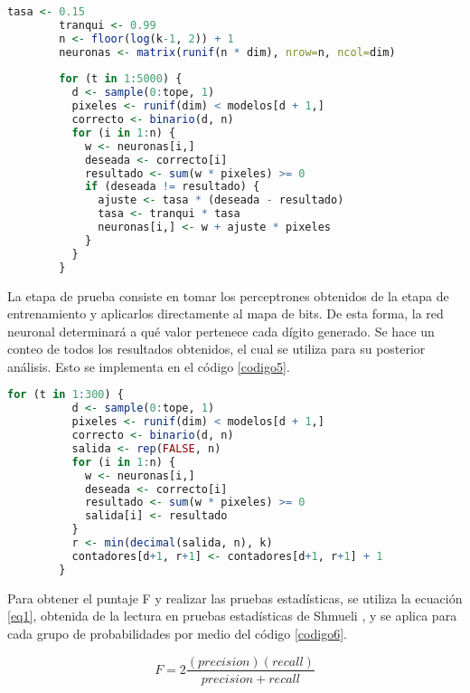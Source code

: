 \documentclass{report}
\begin{document}
\begin{lstlisting}[caption=Etapa de Entrenamiento de los Perceptrones, label=codigo4, language=R]
        tasa <- 0.15
        tranqui <- 0.99
        n <- floor(log(k-1, 2)) + 1
        neuronas <- matrix(runif(n * dim), nrow=n, ncol=dim)
        
        for (t in 1:5000) {
          d <- sample(0:tope, 1)
          pixeles <- runif(dim) < modelos[d + 1,]
          correcto <- binario(d, n)
          for (i in 1:n) {
            w <- neuronas[i,]
            deseada <- correcto[i]
            resultado <- sum(w * pixeles) >= 0
            if (deseada != resultado) {
              ajuste <- tasa * (deseada - resultado)
              tasa <- tranqui * tasa
              neuronas[i,] <- w + ajuste * pixeles
            }
          }
        }
\end{lstlisting}

La etapa de prueba consiste en tomar los perceptrones obtenidos de la etapa de entrenamiento y aplicarlos directamente al mapa de bits. De esta forma, la red neuronal determinar\'a a qu\'e valor pertenece cada d\'igito generado. Se hace un conteo de todos los resultados obtenidos, el cual se utiliza para su posterior an\'alisis. Esto se implementa en el c\'odigo \ref{codigo5}.

\begin{lstlisting}[caption=Etapa de Prueba y Obtenci\'on de Resultados, label=codigo5, language=R]
        for (t in 1:300) {
          d <- sample(0:tope, 1)
          pixeles <- runif(dim) < modelos[d + 1,]
          correcto <- binario(d, n)
          salida <- rep(FALSE, n)
          for (i in 1:n) {
            w <- neuronas[i,]
            deseada <- correcto[i]
            resultado <- sum(w * pixeles) >= 0
            salida[i] <- resultado
          }
          r <- min(decimal(salida, n), k)
          contadores[d+1, r+1] <- contadores[d+1, r+1] + 1
        }
\end{lstlisting}

\newpage

Para obtener el puntaje F y realizar las pruebas estad\'isticas, se utiliza la ecuaci\'on \ref{eq1}, obtenida de la lectura en pruebas estad\'isticas de Shmueli \cite{f1}, y se aplica para cada grupo de probabilidades por medio del c\'odigo \ref{codigo6}.

\begin{equation}\label{eq1}
    F=2\frac{(precision)(recall)}{precision+recall}
\end{equation}
\end{document}

